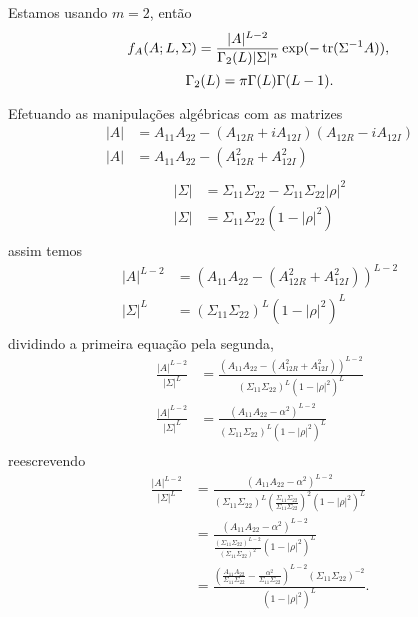 Estamos usando $m=2$, então
\begin{equation}\label{ap:eq_wishart}
	f_A(A; L, \Sigma)=\frac{|A|^{L-2}}{\Gamma_2(L)|\Sigma|^n} \exp(-\operatorname{tr}(\Sigma^{-1}A)), \\
\end{equation}
\begin{equation*}
	\Gamma_2(L)=\pi\Gamma(L)\Gamma(L-1). \\
\end{equation*}

Efetuando as manipulações algébricas com as matrizes
\begin{align*} 
	|A|&=A_{11}A_{22}-(A_{12R}+iA_{12I})(A_{12R}-iA_{12I})\\
	|A|&=A_{11}A_{22}-(A_{12R}^2+A_{12I}^2)\\	
\end{align*}
\begin{align*} 
	|\Sigma|&=\Sigma_{11}\Sigma_{22}-\Sigma_{11}\Sigma_{22}|\rho|^2\\
	|\Sigma|&=\Sigma_{11}\Sigma_{22}(1-|\rho|^2)\\
\end{align*}
assim temos
\begin{align*} 
	|A|^{L-2}&=(A_{11}A_{22}-(A_{12R}^2+A_{12I}^2))^{L-2}\\
	|\Sigma|^{L}  &=(\Sigma_{11}\Sigma_{22})^{L}(1-|\rho|^2)^{L}\\
\end{align*}
dividindo a primeira equação pela segunda,
\begin{align*}
	\frac{|A|^{L-2}}{|\Sigma|^{L}}&=\frac{(A_{11}A_{22}-(A_{12R}^2+A_{12I}^2))^{L-2}}{(\Sigma_{11}\Sigma_{22})^{L}(1-|\rho|^2)^{L}}\\
	\frac{|A|^{L-2}}{|\Sigma|^{L}}&=\frac{(A_{11}A_{22}-\alpha^2)^{L-2}}{(\Sigma_{11}\Sigma_{22})^{L}(1-|\rho|^2)^{L}}\\
\end{align*}
reescrevendo
\begin{align*}
	\frac{|A|^{L-2}}{|\Sigma|^{L}}&=\frac{(A_{11}A_{22}-\alpha^2)^{L-2}}{(\Sigma_{11}\Sigma_{22})^{L}\left(\frac{\Sigma_{11}\Sigma_{22}}{\Sigma_{11}\Sigma_{22}}\right)^2(1-|\rho|^2)^{L}}\\
	&=\frac{(A_{11}A_{22}-\alpha^2)^{L-2}}{\frac{(\Sigma_{11}\Sigma_{22})^{L-2}}{\left(\Sigma_{11}\Sigma_{22}\right)^2}(1-|\rho|^2)^{L}}\\
	&=\frac{\left(\frac{A_{11}A_{22}}{\Sigma_{11}\Sigma_{22}}-\frac{\alpha^2}{\Sigma_{11}\Sigma_{22}}\right)^{L-2}(\Sigma_{11}\Sigma_{22})^{-2}}{(1-|\rho|^2)^{L}}.\\
\end{align*}

